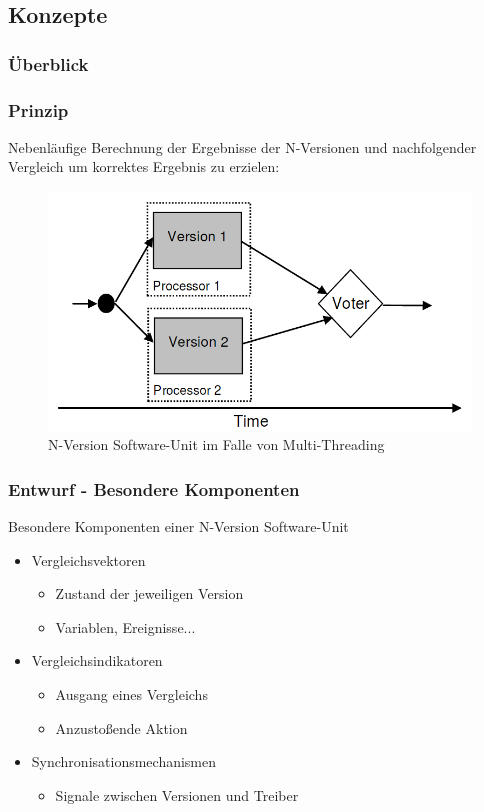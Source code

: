 \subsection{Konzepte}
%
%
\begin{frame}
	\frametitle{Überblick}
	\tableofcontents[currentsubsection]
\end{frame}
%
%
\begin{frame}
	\frametitle{Prinzip}
	Nebenläufige Berechnung der Ergebnisse der N-Versionen und nachfolgender Vergleich um korrektes Ergebnis zu erzielen:
	\begin{figure}
		\includegraphics[scale=0.3]{grafiken/multi-thread-n-version.png}		
		\caption{N-Version Software-Unit im Falle von Multi-Threading
			\footnotemark		
		}		
	\end{figure}
\end{frame}
%
%
\begin{frame}
	\frametitle{Entwurf - Besondere Komponenten}
	Besondere Komponenten einer N-Version Software-Unit
	\begin{itemize}
		\item Vergleichsvektoren
		\begin{itemize}
			\item Zustand der jeweiligen Version
			\item Variablen, Ereignisse...
		\end{itemize}
		\pause
		\item Vergleichsindikatoren
		\begin{itemize}
			\item Ausgang eines Vergleichs
			\item Anzustoßende Aktion
		\end{itemize}
		\pause
		\item Synchronisationsmechanismen
		\begin{itemize}
			\item Signale zwischen Versionen und Treiber
		\end{itemize}
	\end{itemize}
\end{frame}
